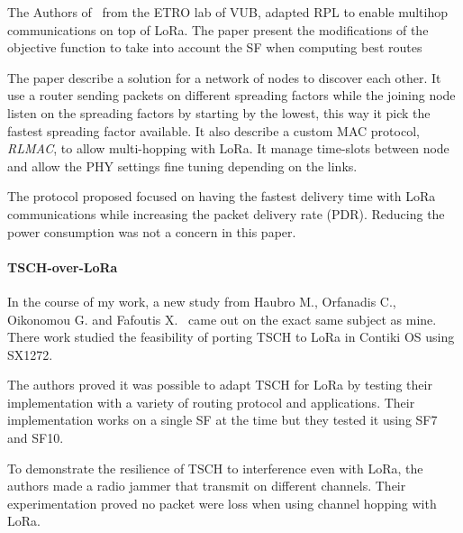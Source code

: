 The Authors of~\cite{8115756} from the ETRO lab of VUB, adapted RPL to enable
multihop communications on top of LoRa. The paper present the modifications of
the objective function to take into account the SF when computing best routes

The paper describe a solution for a network of nodes to discover each other. It
use a router sending packets on different spreading factors while the joining
node listen on the spreading factors by starting by the lowest, this way it
pick the fastest spreading factor available.
It also describe a custom MAC protocol, \emph{RLMAC}, to allow multi-hopping
with LoRa. It manage time-slots between node and allow the PHY settings fine
tuning depending on the links.

The protocol proposed focused on having the fastest delivery time with LoRa
communications while increasing the packet delivery rate (PDR).
Reducing the power consumption was not a concern in this paper.


\paragraph{TSCH-over-LoRa}

In the course of my work, a new study from Haubro M., Orfanadis C.,
Oikonomou G. and Fafoutis X.~\cite{tschoverlora} came out on the exact 
same subject as mine. There work studied the feasibility of porting 
TSCH to LoRa in Contiki OS using SX1272.

The authors proved it was possible to adapt TSCH for LoRa by testing their
implementation with a variety of routing protocol and applications.
Their implementation works on a single SF at the time but they tested it using
SF7 and SF10.

To demonstrate the resilience of TSCH to interference even with LoRa, the
authors made a radio jammer that transmit on different channels. Their
experimentation proved no packet were loss when using channel hopping with
LoRa.
